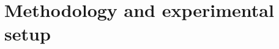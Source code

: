 \documentclass[Afour,sageh,times]{sagej}
\begin{document}
%
%
\section{Methodology and experimental setup}
\label{sec:met}
%
%
%
%
%
%
%
%
%
\end{document}
